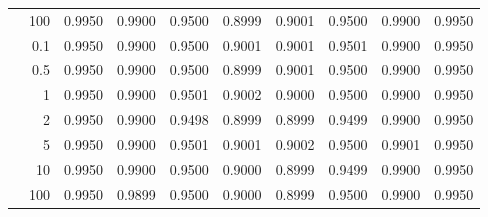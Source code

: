 \begin{tabular}{rrrrrrrrrr}
 & 100 & 0.9950 & 0.9900 & 0.9500 & 0.8999 & 0.9001 & 0.9500 & 0.9900 & 0.9950 \\
\addlinespace
20 & 0.1 & 0.9950 & 0.9900 & 0.9500 & 0.9001 & 0.9001 & 0.9501 & 0.9900 & 0.9950 \\
 & 0.5 & 0.9950 & 0.9900 & 0.9500 & 0.8999 & 0.9001 & 0.9500 & 0.9900 & 0.9950 \\
 & 1 & 0.9950 & 0.9900 & 0.9501 & 0.9002 & 0.9000 & 0.9500 & 0.9900 & 0.9950 \\
 & 2 & 0.9950 & 0.9900 & 0.9498 & 0.8999 & 0.8999 & 0.9499 & 0.9900 & 0.9950 \\
 & 5 & 0.9950 & 0.9900 & 0.9501 & 0.9001 & 0.9002 & 0.9500 & 0.9901 & 0.9950 \\
 & 10 & 0.9950 & 0.9900 & 0.9500 & 0.9000 & 0.8999 & 0.9499 & 0.9900 & 0.9950 \\
 & 100 & 0.9950 & 0.9899 & 0.9500 & 0.9000 & 0.8999 & 0.9500 & 0.9900 & 0.9950 \\
\bottomrule
\end{tabular}
